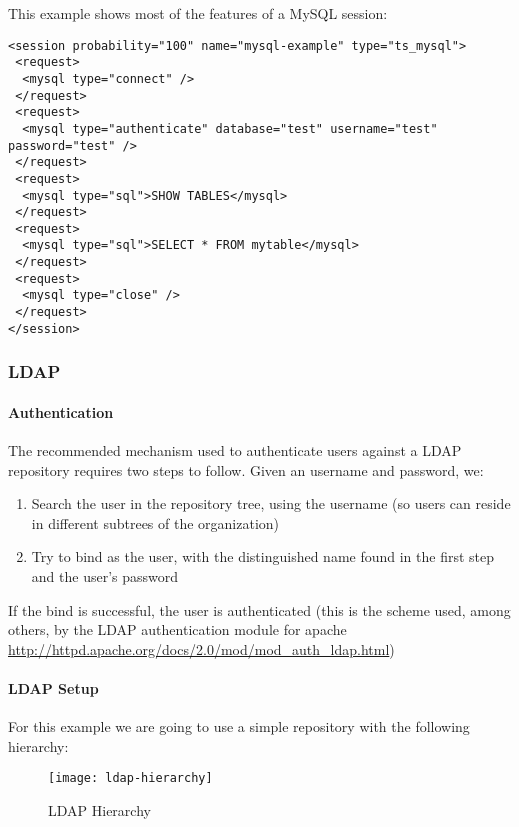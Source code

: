 \documentclass{IDXDOC-en}
\begin{document}
This example shows most of the features of a MySQL session:

\begin{Verbatim}
<session probability="100" name="mysql-example" type="ts_mysql">
 <request>
  <mysql type="connect" />
 </request>
 <request>
  <mysql type="authenticate" database="test" username="test" password="test" />
 </request>
 <request>
  <mysql type="sql">SHOW TABLES</mysql>
 </request>
 <request>
  <mysql type="sql">SELECT * FROM mytable</mysql>
 </request>
 <request>
  <mysql type="close" />
 </request>
</session>
\end{Verbatim}

\subsubsection{LDAP}
\label{sec:session:ldap}

\paragraph{Authentication}
The recommended mechanism used to authenticate users against a LDAP
repository requires two steps to follow. Given an username and
password, we:

\begin{enumerate}
\item Search the user in the repository tree, using the username (so users can reside in different subtrees of the organization)
\item Try to bind as the user, with the distinguished name found in the first step and the user's password
\end{enumerate}

If the bind is successful, the user is authenticated (this is the
scheme used, among others, by the LDAP authentication module for
apache \url{http://httpd.apache.org/docs/2.0/mod/mod_auth_ldap.html})

\paragraph{LDAP Setup}
For this example we are going to use a simple repository with the following hierarchy:

\begin{figure}[htb]
  \begin{center}
    \texttt{[image: ldap-hierarchy]}
    \end{center}
      \caption{LDAP Hierarchy}
    \label{fig:ldap:hierarchy}
\end{figure}
\end{document}
